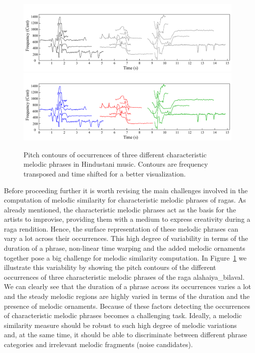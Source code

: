 \begin{figure}
	\begin{center}
		\ifdefined\PRINTVER
			\includegraphics[width=\figSizeHundred]{ch06_patterns/figures/ImprovingSimilarity/phraseClassesExample_BW.pdf}
		\else
			\includegraphics[width=\figSizeHundred]{ch06_patterns/figures/ImprovingSimilarity/phraseClassesExample.pdf}
		\fi
	\end{center}
	\caption[Examples of different occurrences of the \gls{raga} motifs]{Pitch contours of occurrences of three different characteristic melodic phrases in Hindustani music. Contours are frequency transposed and time shifted for a better visualization.}
	\label{fig:phraseComplexityExample}
\end{figure}

Before proceeding further it is worth revising the main challenges involved in the computation of melodic similarity for characteristic melodic phrases of \glspl{raga}. As already mentioned, the characteristic melodic phrases act as the basis for the artists to improvise, providing them with a medium to express creativity during a \gls{raga} rendition. Hence, the surface representation of these melodic phrases can vary a lot across their occurrences. This high degree of variability in terms of the duration of a phrase, non-linear time warping and the added melodic ornaments together pose a big challenge for melodic similarity computation. In Figure~\ref{fig:phraseComplexityExample} we illustrate this variability by showing the pitch contours of the different occurrences of three characteristic melodic phrases of the \gls{raga} \gls{alahaiya_bilaval}. We can clearly see that the duration of a phrase across its occurrences varies a lot and the steady melodic regions are highly varied in terms of the duration and the presence of melodic ornaments. Because of these factors detecting the occurrences of characteristic melodic phrases becomes a challenging task. Ideally, a melodic similarity measure should be robust to such high degree of melodic variations and, at the same time, it should be able to discriminate between different phrase categories and irrelevant melodic fragments (noise candidates).

